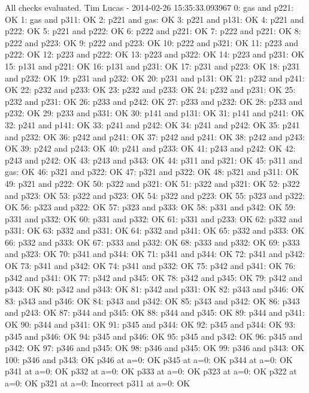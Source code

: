 All checks evaluated.
Tim Lucas - 2014-02-26 15:35:33.093967
0: gas and p221: OK
1: gas and p311: OK
2: p221 and gas: OK
3: p221 and p131: OK
4: p221 and p222: OK
5: p221 and p222: OK
6: p222 and p221: OK
7: p222 and p221: OK
8: p222 and p223: OK
9: p222 and p223: OK
10: p222 and p321: OK
11: p223 and p222: OK
12: p223 and p222: OK
13: p223 and p322: OK
14: p223 and p231: OK
15: p131 and p221: OK
16: p131 and p231: OK
17: p231 and p223: OK
18: p231 and p232: OK
19: p231 and p232: OK
20: p231 and p131: OK
21: p232 and p241: OK
22: p232 and p233: OK
23: p232 and p233: OK
24: p232 and p231: OK
25: p232 and p231: OK
26: p233 and p242: OK
27: p233 and p232: OK
28: p233 and p232: OK
29: p233 and p331: OK
30: p141 and p131: OK
31: p141 and p241: OK
32: p241 and p141: OK
33: p241 and p242: OK
34: p241 and p242: OK
35: p241 and p232: OK
36: p242 and p241: OK
37: p242 and p241: OK
38: p242 and p243: OK
39: p242 and p243: OK
40: p241 and p233: OK
41: p243 and p242: OK
42: p243 and p242: OK
43: p243 and p343: OK
44: p311 and p321: OK
45: p311 and gas: OK
46: p321 and p322: OK
47: p321 and p322: OK
48: p321 and p311: OK
49: p321 and p222: OK
50: p322 and p321: OK
51: p322 and p321: OK
52: p322 and p323: OK
53: p322 and p323: OK
54: p322 and p223: OK
55: p323 and p322: OK
56: p323 and p322: OK
57: p323 and p333: OK
58: p331 and p342: OK
59: p331 and p332: OK
60: p331 and p332: OK
61: p331 and p233: OK
62: p332 and p331: OK
63: p332 and p331: OK
64: p332 and p341: OK
65: p332 and p333: OK
66: p332 and p333: OK
67: p333 and p332: OK
68: p333 and p332: OK
69: p333 and p323: OK
70: p341 and p344: OK
71: p341 and p344: OK
72: p341 and p342: OK
73: p341 and p342: OK
74: p341 and p332: OK
75: p342 and p341: OK
76: p342 and p341: OK
77: p342 and p345: OK
78: p342 and p345: OK
79: p342 and p343: OK
80: p342 and p343: OK
81: p342 and p331: OK
82: p343 and p346: OK
83: p343 and p346: OK
84: p343 and p342: OK
85: p343 and p342: OK
86: p343 and p243: OK
87: p344 and p345: OK
88: p344 and p345: OK
89: p344 and p341: OK
90: p344 and p341: OK
91: p345 and p344: OK
92: p345 and p344: OK
93: p345 and p346: OK
94: p345 and p346: OK
95: p345 and p342: OK
96: p345 and p342: OK
97: p346 and p345: OK
98: p346 and p345: OK
99: p346 and p343: OK
100: p346 and p343: OK
p346 at a=0: OK
p345 at a=0: OK
p344 at a=0: OK
p341 at a=0: OK
p332 at a=0: OK
p333 at a=0: OK
p323 at a=0: OK
p322 at a=0: OK
p321 at a=0: Incorrect
p311 at a=0: OK
